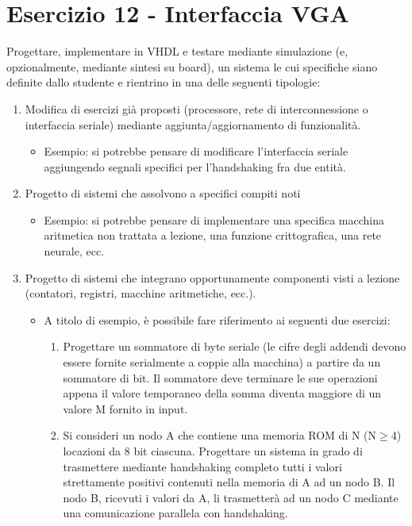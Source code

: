 \documentclass[12pt]{article}
\begin{document}
{\section{Esercizio 12 - Interfaccia VGA}
Progettare, implementare in VHDL e testare mediante simulazione (e, opzionalmente, mediante sintesi su board), un sistema le cui specifiche siano definite dallo studente e rientrino in una delle seguenti tipologie:
\begin{enumerate}[label=\alph*.]
    \item Modifica di esercizi già proposti (processore, rete di interconnessione o interfaccia seriale) mediante aggiunta/aggiornamento di funzionalità.
    \begin{itemize}
        \item Esempio: si potrebbe pensare di modificare l’interfaccia seriale aggiungendo segnali specifici per l’handshaking fra due entità.
    \end{itemize}
    \item Progetto di sistemi che assolvono a specifici compiti noti
    \begin{itemize}
        \item Esempio: si potrebbe pensare di implementare una specifica macchina aritmetica non trattata a lezione, una funzione crittografica, una rete neurale, ecc.
    \end{itemize}
    \item Progetto di sistemi che integrano opportunamente componenti visti a lezione (contatori, registri, macchine aritmetiche, ecc.).
    \begin{itemize}
        \item A titolo di esempio, è possibile fare riferimento ai seguenti due esercizi:
        \begin{enumerate}[label=\roman{*}., ref=(\roman{*})]
            \item Progettare un sommatore di byte seriale (le cifre degli addendi devono essere fornite serialmente a coppie alla macchina) a partire da un sommatore di bit. Il sommatore deve terminare le sue operazioni appena il valore temporaneo della somma diventa maggiore di un valore M fornito in input.
            \item Si consideri un nodo A che contiene una memoria ROM di N (N$\geq$4) locazioni da 8 bit ciascuna. Progettare un sistema in grado di trasmettere mediante handshaking completo tutti i valori strettamente positivi contenuti nella memoria di A ad un nodo B. Il nodo B, ricevuti i valori da A, li trasmetterà ad un nodo C mediante una comunicazione parallela con handshaking.
        \end{enumerate}
    \end{itemize}
\end{enumerate}
}
\end{document}
